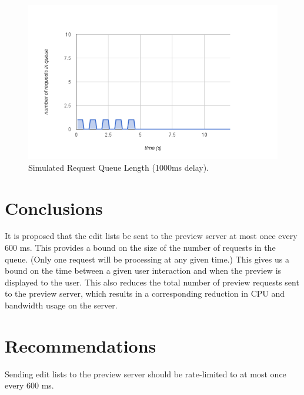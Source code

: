 \documentclass[se,resubmit]{uw-wkrpt}
\begin{document}
\begin{figure}
  \centering
  \includegraphics[width=6.25in]{sim-1000ms}
  \caption{Simulated Request Queue Length (1000ms delay).}
  \label{fig:sim-1000ms}
\end{figure}

\section{Conclusions}
It is proposed that the edit lists be sent to the preview server at most
once every 600 ms. This provides a bound on the size of the number of
requests in the queue. (Only one request will be processing at any given
time.) This gives us a bound on the time between a given user interaction
and when the preview is displayed to the user. This also reduces the total
number of preview requests sent to the preview server, which results in a
corresponding reduction in CPU and bandwidth usage on the server.

\section{Recommendations}
Sending edit lists to the preview server should be rate-limited to at most
once every 600 ms.

\backmatter
\end{document}
